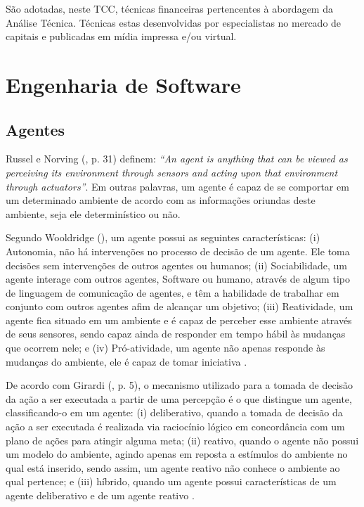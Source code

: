 São adotadas, neste TCC, técnicas financeiras pertencentes à abordagem da Análise Técnica. Técnicas estas desenvolvidas por especialistas no mercado de capitais e publicadas em mídia impressa e/ou virtual.


\section{Engenharia de Software}
\subsection{Agentes}

Russel e Norving (\citeyear{russel2003}, p. 31) definem: \textit{“An agent is anything that can be viewed as perceiving its environment through sensors and acting upon that environment through actuators”}. Em outras palavras, um agente é capaz de se comportar em um determinado ambiente de acordo com as informações oriundas deste ambiente, seja ele determinístico ou não.

Segundo Wooldridge (\citeyear{wooldrige2002}), um agente possui as seguintes características: (i) Autonomia, não há intervenções no processo de decisão de um agente. Ele toma decisões sem intervenções de outros agentes ou humanos; (ii) Sociabilidade, um agente interage com outros agentes, Software ou humano, através de algum tipo de linguagem de comunicação de agentes, e têm a habilidade de trabalhar em conjunto com outros agentes afim de alcançar um objetivo; (iii) Reatividade, um agente fica situado em um ambiente e é capaz de perceber esse ambiente através de seus sensores, sendo capaz ainda de responder em tempo hábil às mudanças que ocorrem nele; e (iv) Pró-atividade, um agente não apenas responde às mudanças do ambiente, ele é capaz de tomar iniciativa \cite[p. 2-3]{wooldrige2002}.

De acordo com Girardi (\citeyear{girardi2004}, p. 5), o mecanismo utilizado para a tomada de decisão da ação a ser executada a partir de uma percepção é o que distingue um agente, classificando-o em um agente: (i) deliberativo, quando a tomada de decisão da ação a ser executada é realizada via raciocínio lógico em concordância com um plano de ações para atingir alguma meta; (ii) reativo, quando o agente não possui um modelo do ambiente, agindo apenas em reposta a estímulos do ambiente no qual está inserido, sendo assim, um agente reativo não conhece o ambiente ao qual pertence; e (iii) híbrido, quando um agente possui características de um agente deliberativo e de um agente reativo \cite[p. 5]{girardi2004}. 

